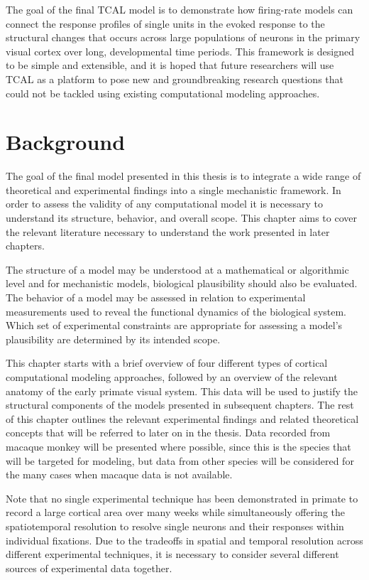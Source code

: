 \documentclass[phd,ianc,twoside]{infthesis}
\begin{document}
The goal of the final TCAL model is to demonstrate how firing-rate
models can connect the response profiles of single units in the evoked
response to the structural changes that occurs across large populations
of neurons in the primary visual cortex over long, developmental time
periods. This framework is designed to be simple and extensible, and it
is hoped that future researchers will use TCAL as a platform to pose
new and groundbreaking research questions that could not be tackled
using existing computational modeling approaches.


\chapter{Background}
\label{chapter:background}

The goal of the final model presented in this thesis is to integrate a
wide range of theoretical and experimental findings into a single
mechanistic framework. In order to assess the validity of any
computational model it is necessary to understand its structure,
behavior, and overall scope. This chapter aims to cover the
relevant literature necessary to understand the work presented in later
chapters.

The structure of a model may be understood at a mathematical or
algorithmic level and for mechanistic models, biological plausibility
should also be evaluated. The behavior of a model may be assessed in relation
to experimental measurements used to reveal the functional dynamics of
the biological system. Which set of experimental constraints are
appropriate for assessing a model's plausibility are determined by its
intended scope.

This chapter starts with a brief overview of four different types of
cortical computational modeling approaches, followed by an overview of
the relevant anatomy of the early primate visual system. This data will be
used to justify the structural components of the models presented in
subsequent chapters. The rest of this chapter outlines the relevant
experimental findings and related theoretical concepts that will be
referred to later on in the thesis. Data recorded from macaque monkey
will be presented where possible, since this is the species that will
be targeted for modeling, but data from other species will be
considered for the many cases when macaque data is not available.

Note that no single experimental technique has been demonstrated in
primate to record a
large cortical area over many weeks while simultaneously offering the
spatiotemporal resolution to resolve single neurons and their responses
within individual fixations. Due to the tradeoffs in spatial and
temporal resolution across different experimental techniques, it is
necessary to consider several different sources of experimental data
together.
\end{document}
